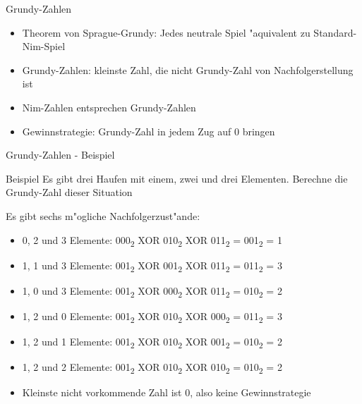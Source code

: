 \documentclass[18pt]{beamer}
\begin{document}
\begin{frame}{Grundy-Zahlen}
\begin{itemize}
\item Theorem von Sprague-Grundy: Jedes neutrale Spiel "aquivalent zu Standard-Nim-Spiel
\item Grundy-Zahlen: kleinste Zahl, die nicht Grundy-Zahl von Nachfolgerstellung ist
\item Nim-Zahlen entsprechen Grundy-Zahlen
\item Gewinnstrategie: Grundy-Zahl in jedem Zug auf 0 bringen
\end{itemize}
\end{frame}

\begin{frame}{Grundy-Zahlen - Beispiel}
\begin{block}{Beispiel}
Es gibt drei Haufen mit einem, zwei und drei Elementen. Berechne die Grundy-Zahl dieser Situation
\end{block}
Es gibt sechs m"ogliche Nachfolgerzust"ande:
\begin{itemize}
\pause
\item 0, 2 und 3 Elemente: 000\textsubscript{2} XOR 010\textsubscript{2} XOR 011\textsubscript{2} = 001\textsubscript{2} = 1
\pause
\item 1, 1 und 3 Elemente: 001\textsubscript{2} XOR 001\textsubscript{2} XOR 011\textsubscript{2} = 011\textsubscript{2} = 3
\pause
\item 1, 0 und 3 Elemente: 001\textsubscript{2} XOR 000\textsubscript{2} XOR 011\textsubscript{2} = 010\textsubscript{2} = 2
\pause
\item 1, 2 und 0 Elemente: 001\textsubscript{2} XOR 010\textsubscript{2} XOR 000\textsubscript{2} = 011\textsubscript{2} = 3
\pause
\item 1, 2 und 1 Elemente: 001\textsubscript{2} XOR 010\textsubscript{2} XOR 001\textsubscript{2} = 010\textsubscript{2} = 2
\pause
\item 1, 2 und 2 Elemente: 001\textsubscript{2} XOR 010\textsubscript{2} XOR 010\textsubscript{2} = 010\textsubscript{2} = 2
\pause
\item Kleinste nicht vorkommende Zahl ist 0, also keine Gewinnstrategie
\end{itemize}
\end{frame}
\end{document}
